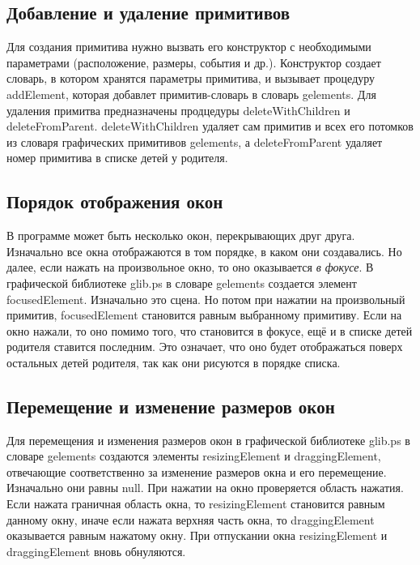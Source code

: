 \documentclass[14pt]{extarticle}
\begin{document}
	\subsection{Добавление и удаление примитивов}
	Для создания примитива нужно вызвать его конструктор с необходимыми параметрами (расположение, размеры, события и др.). Конструктор создает словарь, в котором хранятся параметры примитива, и вызывает процедуру \linebreak addElement, которая добавлет примитив-словарь в словарь gelements. Для удаления примитва предназначены продцедуры deleteWithChildren и \linebreak deleteFromParent. deleteWithChildren удаляет сам примитив и всех его потомков из словаря графических примитивов gelements, а deleteFromParent удаляет номер примитива в списке детей у родителя.
	
	\subsection{Порядок отображения окон}
	В программе может быть несколько окон, перекрывающих друг друга. Изначально все окна отображаются в том порядке, в каком они создавались. Но далее, если нажать на произвольное окно, то оно оказывается \textit{в фокусе}. В графической библиотеке glib.ps в словаре gelements создается элемент focusedElement. Изначально это сцена. Но потом при нажатии на произвольный примитив, \linebreak focusedElement становится равным выбранному примитиву. Если на окно нажали, то оно помимо того, что становится в фокусе, ещё и в списке детей родителя ставится последним. Это означает, что оно будет отображаться поверх остальных детей родителя, так как они рисуются в порядке списка.
	
	\subsection{Перемещение и изменение размеров окон}
	Для перемещения и изменения размеров окон в графической библиотеке glib.ps в словаре gelements создаются элементы resizingElement и  draggingElement, отвечающие соответственно за изменение размеров окна и  его перемещение. Изначально они равны null. При нажатии на окно проверяется область нажатия. Если нажата граничная область окна, то resizingElement становится равным данному окну, иначе если нажата верхняя часть окна, то draggingElement оказывается равным нажатому окну. При отпускании окна resizingElement и draggingElement вновь обнуляются.
	
\end{document}
